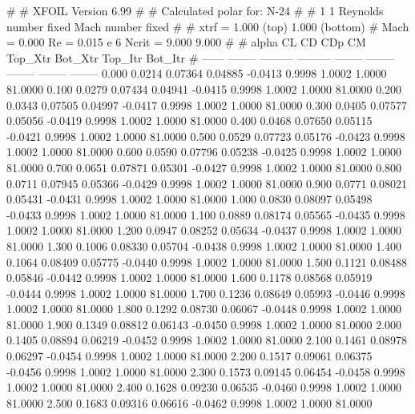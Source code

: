 #  
#       XFOIL         Version 6.99
#  
# Calculated polar for: N-24                                            
#  
# 1 1 Reynolds number fixed          Mach number fixed         
#  
# xtrf =   1.000 (top)        1.000 (bottom)  
# Mach =   0.000     Re =     0.015 e 6     Ncrit =   9.000  9.000
#  
#   alpha    CL        CD       CDp       CM     Top_Xtr  Bot_Xtr  Top_Itr  Bot_Itr
#  ------ -------- --------- --------- -------- -------- -------- -------- --------
   0.000   0.0214   0.07364   0.04885  -0.0413   0.9998   1.0002   1.0000  81.0000
   0.100   0.0279   0.07434   0.04941  -0.0415   0.9998   1.0002   1.0000  81.0000
   0.200   0.0343   0.07505   0.04997  -0.0417   0.9998   1.0002   1.0000  81.0000
   0.300   0.0405   0.07577   0.05056  -0.0419   0.9998   1.0002   1.0000  81.0000
   0.400   0.0468   0.07650   0.05115  -0.0421   0.9998   1.0002   1.0000  81.0000
   0.500   0.0529   0.07723   0.05176  -0.0423   0.9998   1.0002   1.0000  81.0000
   0.600   0.0590   0.07796   0.05238  -0.0425   0.9998   1.0002   1.0000  81.0000
   0.700   0.0651   0.07871   0.05301  -0.0427   0.9998   1.0002   1.0000  81.0000
   0.800   0.0711   0.07945   0.05366  -0.0429   0.9998   1.0002   1.0000  81.0000
   0.900   0.0771   0.08021   0.05431  -0.0431   0.9998   1.0002   1.0000  81.0000
   1.000   0.0830   0.08097   0.05498  -0.0433   0.9998   1.0002   1.0000  81.0000
   1.100   0.0889   0.08174   0.05565  -0.0435   0.9998   1.0002   1.0000  81.0000
   1.200   0.0947   0.08252   0.05634  -0.0437   0.9998   1.0002   1.0000  81.0000
   1.300   0.1006   0.08330   0.05704  -0.0438   0.9998   1.0002   1.0000  81.0000
   1.400   0.1064   0.08409   0.05775  -0.0440   0.9998   1.0002   1.0000  81.0000
   1.500   0.1121   0.08488   0.05846  -0.0442   0.9998   1.0002   1.0000  81.0000
   1.600   0.1178   0.08568   0.05919  -0.0444   0.9998   1.0002   1.0000  81.0000
   1.700   0.1236   0.08649   0.05993  -0.0446   0.9998   1.0002   1.0000  81.0000
   1.800   0.1292   0.08730   0.06067  -0.0448   0.9998   1.0002   1.0000  81.0000
   1.900   0.1349   0.08812   0.06143  -0.0450   0.9998   1.0002   1.0000  81.0000
   2.000   0.1405   0.08894   0.06219  -0.0452   0.9998   1.0002   1.0000  81.0000
   2.100   0.1461   0.08978   0.06297  -0.0454   0.9998   1.0002   1.0000  81.0000
   2.200   0.1517   0.09061   0.06375  -0.0456   0.9998   1.0002   1.0000  81.0000
   2.300   0.1573   0.09145   0.06454  -0.0458   0.9998   1.0002   1.0000  81.0000
   2.400   0.1628   0.09230   0.06535  -0.0460   0.9998   1.0002   1.0000  81.0000
   2.500   0.1683   0.09316   0.06616  -0.0462   0.9998   1.0002   1.0000  81.0000
